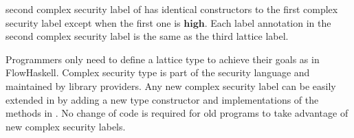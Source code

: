 second complex security label of  has identical constructors to the 
first complex security label except when the first one is $\mathbf{high}$. Each label
annotation in the second complex security label is the same as the third lattice 
label.

Programmers only need to define a lattice type to achieve their goals as in FlowHaskell. 
Complex security type  is part of the security language and 
maintained by library providers. Any new complex security label can be easily extended 
in  by adding a new type constructor and implementations of the methods
in . No change of code is required for old programs to 
take advantage of new complex security labels.

